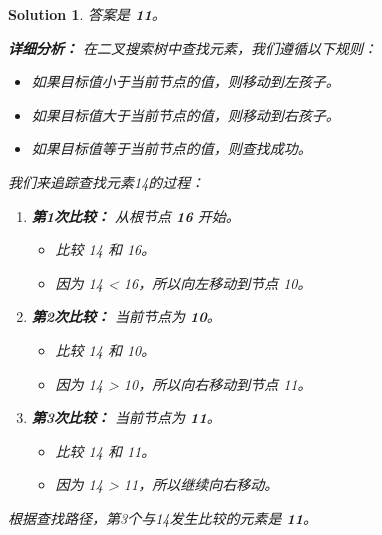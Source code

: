 \documentclass[UTF8]{report}
\newtheorem{solution}{Solution}
\theoremstyle{MyLineTheoremStyle} %
\theoremstyle{MyBlockTheoremStyle} %
\theoremstyle{MySubsubsectionStyle} %
\begin{document}
\begin{solution}
答案是 \textbf{11}。

\textbf{详细分析：}
在二叉搜索树中查找元素，我们遵循以下规则：
\begin{itemize}
    \item 如果目标值小于当前节点的值，则移动到左孩子。
    \item 如果目标值大于当前节点的值，则移动到右孩子。
    \item 如果目标值等于当前节点的值，则查找成功。
\end{itemize}

我们来追踪查找元素14的过程：
\begin{enumerate}
    \item \textbf{第1次比较：} 从根节点 \textbf{16} 开始。
        \begin{itemize}
            \item 比较 14 和 16。
            \item 因为 14 < 16，所以向左移动到节点 10。
        \end{itemize}
    \item \textbf{第2次比较：} 当前节点为 \textbf{10}。
        \begin{itemize}
            \item 比较 14 和 10。
            \item 因为 14 > 10，所以向右移动到节点 11。
        \end{itemize}
    \item \textbf{第3次比较：} 当前节点为 \textbf{11}。
        \begin{itemize}
            \item 比较 14 和 11。
            \item 因为 14 > 11，所以继续向右移动。
        \end{itemize}
\end{enumerate}
根据查找路径，第3个与14发生比较的元素是 \textbf{11}。
\end{solution}
\end{document}

